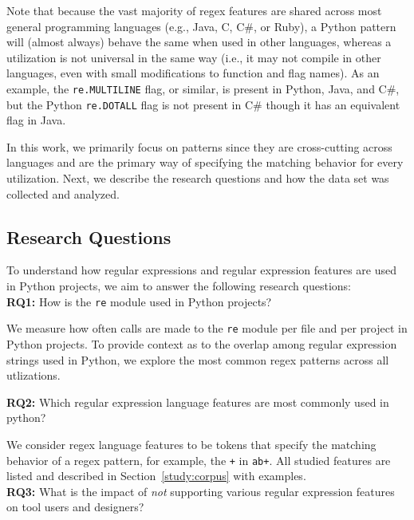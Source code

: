 Note that because the vast majority of regex features are shared across most general programming languages (e.g., Java, C, C\#, or Ruby), a Python {pattern} will (almost always) behave the same when used in other languages, whereas a utilization is not universal in the same way (i.e., it may not compile in other languages, even with small modifications to function and flag names).
As an example, the {\tt re.MULTILINE} flag, or similar, is present in Python, Java, and C\#, but  the Python {\tt re.DOTALL} flag is not present in C\# though it has an equivalent flag in Java.

In this work, we primarily focus on patterns since they are cross-cutting across languages and are the primary way of specifying the matching behavior for every utilization. Next, we describe the research questions and how the data set was collected and analyzed.

\subsection{Research Questions}
\label{sec:rqs}
To understand how regular expressions and regular expression features are used in Python projects, we aim to answer the following research questions:\\
\leavevmode\color{gray}
\noindent \textbf{RQ1:} How  is the {\tt re} module used in Python projects?

We measure how often calls are made to the {\tt re} module per file and per project in Python projects.
To provide context as to the overlap among regular expression strings used in Python, we explore the most common regex {patterns} across all utlizations.\\

\leavevmode\color{black}

\noindent \textbf{RQ2:} Which regular expression language features are most commonly used in python?

We consider regex language features to be tokens that specify the matching behavior of a regex pattern, for example,  the {\tt +} in {\tt ab+}.  All studied features are listed and described in Section~\ref{study:corpus} with examples.\\

\noindent \textbf{RQ3:} What is the impact of \emph{not} supporting various regular expression features on tool users and designers?

